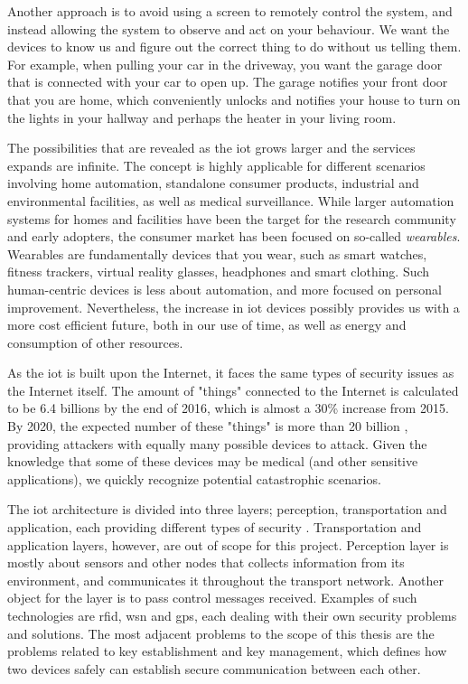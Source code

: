 Another approach is to avoid using a screen to remotely control the system, and instead allowing the system to observe and act on your behaviour. We want the devices to know us and figure out the correct thing to do without us telling them. For example, when pulling your car in the driveway, you want the garage door that is connected with your car to open up. The garage notifies your front door that you are home, which conveniently unlocks and notifies your house to turn on the lights in your hallway and perhaps the heater in your living room.




The possibilities that are revealed as the \gls{iot} grows larger and the services expands are infinite. The concept is highly applicable for different scenarios involving home automation, standalone consumer products, industrial and environmental facilities, as well as medical surveillance. While larger automation systems for homes and facilities have been the target for the research community and early adopters, the consumer market has been focused on so-called \emph{wearables}. Wearables are fundamentally devices that you wear, such as smart watches, fitness trackers, virtual reality glasses, headphones and smart clothing. Such human-centric devices is less about automation, and more focused on personal improvement. Nevertheless, the increase in \gls{iot} devices possibly provides us with a more cost efficient future, both in our use of time, as well as energy and consumption of other resources.


As the \gls{iot} is built upon the Internet, it faces the same types of security issues as the Internet itself. The amount of "things" connected to the Internet is calculated to be 6.4 billions by the end of 2016, which is almost a 30\% increase from 2015. By 2020, the expected number of these "things" is more than 20 billion \cite{iot-gartner}, providing attackers with equally many possible devices to attack. Given the knowledge that some of these devices may be medical (and other sensitive applications), we quickly recognize potential catastrophic scenarios.


The \gls{iot} architecture is divided into three layers; perception, transportation and application, each providing different types of security \cite{Jing2014}. Transportation and application layers, however, are out of scope for this project. Perception layer is mostly about sensors and other nodes that collects information from its environment, and communicates it throughout the transport network. Another object for the layer is to pass control messages received. Examples of such technologies are \gls{rfid}, \gls{wsn} and \gls{gps}, each dealing with their own security problems and solutions. The most adjacent problems to the scope of this thesis are the problems related to key establishment and key management, which defines how two devices safely can establish secure communication between each other.

